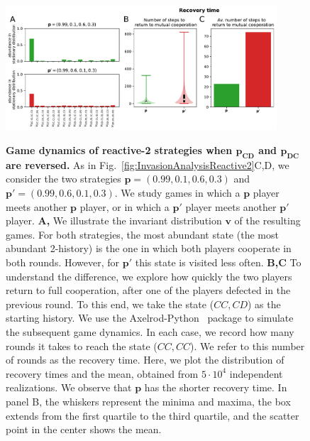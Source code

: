 \documentclass[9pt,twoside,lineno]{pnas-new}
\theoremstyle{plainCl1}
\theoremstyle{plainCl2}
\begin{document}
\begin{figure}[tbhp]
  ~\\
  \includegraphics[width=0.9\textwidth]{../../figures/siFigReactiveTwoPayoffs.pdf}
  \caption{\textbf{Game dynamics of reactive-2 strategies when $\mathbf{p_{CD}}$ and $\mathbf{p_{DC}}$ are reversed.}
  As in Fig.~\ref{fig:InvasionAnalysisReactive2}C,D, we consider the two strategies $\mathbf{p}\!=\!(0.99,0.1,0.6,0.3)$ and $\mathbf{p'}\!=\!(0.99,0.6,0.1,0.3)$. We study games in which a $\mathbf{p}$ player meets another $\mathbf{p}$ player, or in which a $\mathbf{p'}$ player meets another $\mathbf{p'}$ player. 
  \textbf{A,} We illustrate the invariant distribution $\mathbf{v}$ of the resulting games. 
  For both strategies, the most abundant state (the most abundant 2-history) is the one in which both players cooperate in both rounds. 
  However, for $\mathbf{p'}$ this state is visited less often. 
  \textbf{B,C} To understand the difference, we explore how quickly the two players return to full cooperation, after one of the players defected in the previous round. 
  To this end, we take the state ($CC,CD$) as the starting history. 
  We use the Axelrod-Python~\cite{AxelrodPython}
  package to simulate the subsequent game dynamics. 
  In each case, we record how many rounds it takes to reach the state ($CC,CC$). 
  We refer to this number of rounds as the recovery time. 
  Here, we plot the distribution of recovery times and the mean, obtained from $5\!\cdot\!10^4$ independent realizations. 
  We observe that $\mathbf{p}$ has the shorter recovery time.
  In panel B, the whiskers represent the minima and maxima, the box extends from the first quartile to the third quartile, and the scatter point in the center shows the mean. }\label{fig:ReactiveTwoPayoffs}
\end{figure}
\end{document}
